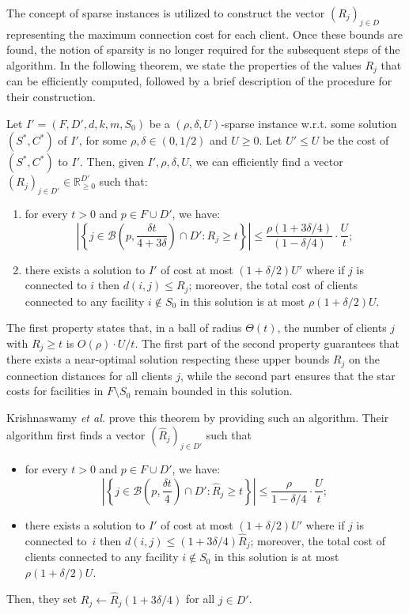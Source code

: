 The concept of sparse instances is utilized to construct the vector $(R_j)_{j \in D}$ representing the maximum connection cost for each client. Once these bounds are found, the notion of sparsity is no longer required for the subsequent steps of the algorithm. In the following theorem, we state the properties of the values $R_j$ that can be efficiently computed, followed by a brief description of the procedure for their construction.

\begin{theorem} \label{thm:radius_existence}
Let $I' = (F, D', d, k, m, S_0)$ be a $(\rho, \delta, U)$-sparse instance w.r.t. some solution $(S^*, C^*)$ of $I'$, for some $\rho, \delta \in (0, 1/2)$ and $U \ge 0$. Let $U' \le U$ be the cost of $(S^*, C^*)$ to $I'$. Then, given $I', \rho, \delta, U$, we can efficiently find a vector $(R_j)_{j \in D'} \in \mathbb{R}^{D'}_{\ge 0}$ such that:
\begin{enumerate}
    \item for every $t > 0$ and $p \in F \cup D'$, we have:
    \[ \left| \left\{ j \in \mathcal{B} \left( p, \frac{\delta t}{4 + 3\delta} \right) \cap D' : R_j \ge t \right\} \right| \le \frac{\rho(1 + 3\delta/4)}{(1 - \delta/4)} \cdot \frac{U}{t}; \]
    \item there exists a solution to $I'$ of cost at most $(1 + \delta/2)U'$ where if $j$ is connected to $i$ then $d(i, j) \le R_j$; moreover, the total cost of clients connected to any facility $i \notin S_0$ in this solution is at most $\rho (1 + \delta/2) U$.
\end{enumerate}
\end{theorem}

The first property states that, in a ball of radius $\Theta(t)$, the number of clients $j$ with $R_j \ge t$ is $O(\rho) \cdot U/t$. The first part of the second property guarantees that there exists a near-optimal solution respecting these upper bounds $R_j$ on the connection distances for all clients $j$, while the second part ensures that the star costs for facilities in $F \setminus S_0$ remain bounded in this solution.

Krishnaswamy \emph{et al.} prove this theorem by providing such an algorithm. Their algorithm first finds a vector $(\hat{R}_j)_{j \in D'}$ such that
\begin{itemize}
    \item[(i)] for every $t > 0$ and $p \in F \cup D'$, we have:
    \begin{equation}
        \label{ineq:Rhat}
        \left| \left\{ j \in \mathcal{B} \left( p, \frac{\delta t}{4} \right) \cap D' : \hat{R}_j \ge t \right\} \right| \le \frac{\rho}{1 - \delta/4} \cdot \frac{U}{t};
    \end{equation}
    \item[(ii)] there exists a solution to $I'$ of cost at most $(1 + \delta/2)U'$ where if $j$ is connected to~$i$ then $d(i, j) \le (1+3\delta/4)\hat{R}_j$; moreover, the total cost of clients connected to any facility $i \notin S_0$ in this solution is at most $\rho (1 + \delta/2) U$.
\end{itemize}
Then, they set $R_j \gets \hat{R}_j (1+3\delta/4)$ for all $j \in D'$.

